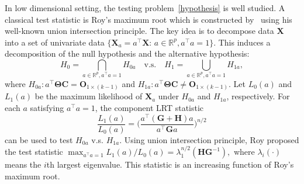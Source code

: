 \documentclass[12pt]{article} %
\newcommand{\bX}{\mathbf{X}}
\newcommand{\bH}{\mathbf{H}}
\newcommand{\bG}{\mathbf{G}}
\newcommand{\bC}{\mathbf{C}}
\newcommand{\bO}{\mathbf{O}}
\newcommand{\bfsym}[1]{\ensuremath{\boldsymbol{#1}}}
\def\bTheta {\bfsym {\Theta}}
\theoremstyle{definition}
\begin{document}
In low dimensional setting, the testing problem~\eqref{hypothesis} is well studied.
A classical test statistic is Roy's maximum root which is constructed by~\cite{Roy1953} using his well-known union intersection principle.
        The key idea is to decompose data $\bX$ into a set of univariate data $\{\bX_{a}=a^\top \bX:\, a\in \mathbb{R}^p, a^\top a=1\}$.
        This induces a decomposition of the null hypothesis and the alternative hypothesis:
        $$
        H_0=\bigcap_{a\in\mathbb{R}^p, a^\top a=1} H_{0a} \quad \text{v.s.} \quad 
        H_1=\bigcup_{a\in\mathbb{R}^p, a^\top a=1} H_{1a},
        $$
        where 
 $H_{0a}: a^\top \bTheta \bC = \bO_{1\times (k-1)}$ and  $H_{1a} : a^\top \bTheta \bC \neq \bO_{1\times (k-1)}$.
Let $L_0(a)$ and $L_1(a)$ be the maximum likelihood of $\bX_a$ under $H_{0a}$ and $H_{1a}$, respectively.
For each $a$ satisfying $a^\top a=1$, the component LRT statistic
$$ \frac{L_1(a)}{L_0(a)}=\Big(\frac{a^\top(\bG+\bH) a}{a^\top \bG a}\Big)^{n/2}$$
can be used to test $H_{0a}$ v.s. $H_{1a}$. 
Using union intersection principle, Roy proposed the test statistic
$
\max_{a^\top a=1}  {L_1(a)}/{L_0(a)}=\lambda_{1}^{n/2}(\bH\bG^{-1}),
$
where $\lambda_{i}(\cdot)$ means the $i$th largest eigenvalue.
This statistic is an increasing function of Roy's maximum root.
\end{document}
